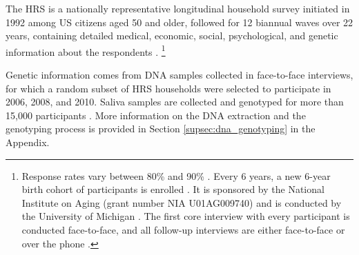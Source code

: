 \documentclass[11pt]{article}
\begin{document}
The HRS is a nationally representative longitudinal household survey initiated in 1992 among US citizens aged 50 and older, followed for 12 biannual waves over 22 years, containing detailed medical, economic, social, psychological, and genetic information about the respondents \citep{Sonnega2014cohort}.%
\footnote{Response rates vary between 80\% and 90\% \citep{HRSResponseRate}. Every 6 years, a new 6-year birth cohort of participants is enrolled \citep{HRS21stCentury}. It is sponsored by the National Institute on Aging (grant number NIA U01AG009740) and is conducted by the University of Michigan \citep{HRSWebsite}.
The first core interview with every participant is conducted face-to-face, and all follow-up interviews are either face-to-face or over the phone \citep{HRS21stCentury}.
}

Genetic information comes from DNA samples collected in face-to-face interviews, for which a random subset of HRS households were selected to participate in 2006, 2008, and 2010.
Saliva samples are collected and genotyped for more than 15,000 participants \citep{HRSPGenscore2017}.
More information on the DNA extraction and the genotyping process is provided in Section \ref{supsec:dna_genotyping} in the Appendix.
\end{document}
